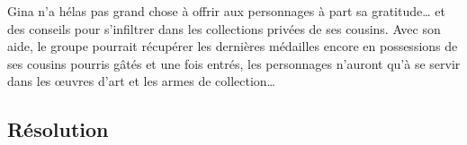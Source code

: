 Gina n'a hélas pas grand chose à offrir aux personnages à part sa gratitude… et des conseils pour s'infiltrer dans les collections privées de ses cousins. Avec son aide, le groupe pourrait récupérer les dernières médailles encore en possessions de ses cousins pourris gâtés et une fois entrés, les personnages n'auront qu'à se servir dans les œuvres d'art et les armes de collection…

\subsection{Résolution}

